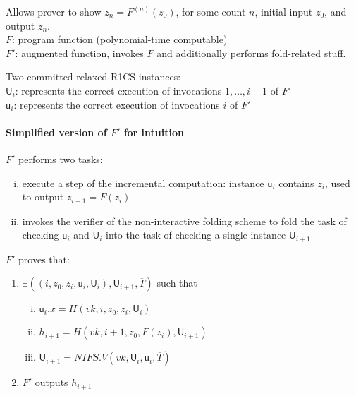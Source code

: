 \documentclass{article}
\theoremstyle{definition}
\begin{document}
Allows prover to show $z_n = F^{(n)}(z_0)$, for some count $n$, initial input $z_0$, and output $z_n$.\\
$F$: program function (polynomial-time computable)\\
$F'$: augmented function, invokes $F$ and additionally performs fold-related stuff.

\vspace{0.5cm}
Two committed relaxed R1CS instances:\\
$\mathsf{U}_i$: represents the correct execution of invocations $1, \ldots, i-1$ of $F'$\\
$\mathsf{u}_i$: represents the correct execution of invocations $i$ of $F'$

\paragraph{Simplified version of $F'$ for intuition}
\vspace{0.5cm}
$F'$ performs two tasks:
\begin{enumerate}[i.]
	\item execute a step of the incremental computation:
		instance $\mathsf{u}_i$ contains $z_i$, used to output $z_{i+1}=F(z_i)$
	\item invokes the verifier of the non-interactive folding scheme to fold the task of checking $\mathsf{u}_i$ and $\mathsf{U}_i$ into the task of checking a single instance $\mathsf{U}_{i+1}$
\end{enumerate}

\vspace{0.5cm}
$F'$ proves that:
\begin{enumerate}
	\item $\exists ( (i, z_0, z_i, \mathsf{u}_i, \mathsf{U}_i), \mathsf{U}_{i+1}, \overline{T})$ such that
	\begin{enumerate}[i.]
		\item $\mathsf{u}_i.x = H(vk, i, z_0, z_i, \mathsf{U}_i)$
		\item $h_{i+1} = H(vk, i+1, z_0, F(z_i), \mathsf{U}_{i+1})$
		\item $\mathsf{U}_{i+1} = NIFS.V(vk, \mathsf{U}_i, \mathsf{u}_i, \overline{T})$
	\end{enumerate}
\item $F'$ outputs $h_{i+1}$
\end{enumerate}
\end{document}
